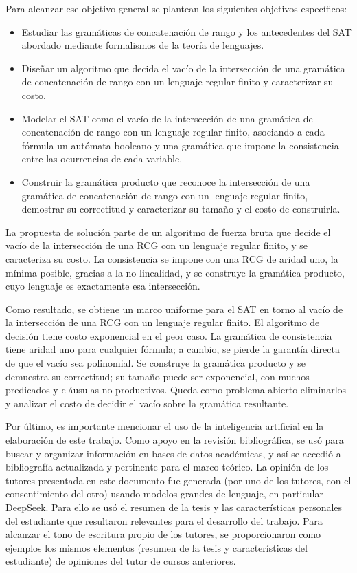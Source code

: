 \documentclass{report}
\begin{document}
Para alcanzar ese objetivo general se plantean los siguientes objetivos
específicos:
\begin{itemize}
  \item Estudiar las gramáticas de concatenación de rango y los
    antecedentes del SAT abordado mediante formalismos de la teoría de
    lenguajes.
  \item Diseñar un algoritmo que decida el vacío de la intersección de una
    gramática de concatenación de rango con un lenguaje regular finito y
    caracterizar su costo.
  \item Modelar el SAT como el vacío de la intersección de una gramática
    de concatenación de rango con un lenguaje regular finito, asociando a
    cada fórmula un autómata booleano y una gramática que impone la
    consistencia entre las ocurrencias de cada variable.
  \item Construir la gramática producto que reconoce la intersección de
    una gramática de concatenación de rango con un lenguaje regular finito,
    demostrar su correctitud y caracterizar su tamaño y el costo de
    construirla.
\end{itemize}

La propuesta de solución parte de un algoritmo de fuerza bruta que decide
el vacío de la intersección de una RCG con un lenguaje regular finito, y
se caracteriza su costo. La consistencia se impone con una RCG de aridad
uno, la mínima posible, gracias a la no linealidad, y se construye la
gramática producto,
cuyo lenguaje es exactamente esa intersección.

Como resultado, se obtiene un marco uniforme para el SAT en torno al
vacío de la intersección de una RCG con un lenguaje regular finito. El
algoritmo de decisión tiene costo exponencial en el peor caso. La
gramática de consistencia tiene aridad uno para cualquier fórmula; a
cambio, se pierde la garantía directa de que el vacío sea polinomial. Se
construye la gramática producto y se demuestra su correctitud; su tamaño
puede ser exponencial, con muchos predicados y cláusulas no productivos.
Queda como problema abierto eliminarlos y analizar el costo de decidir el
vacío sobre la gramática resultante.

Por último, es importante mencionar el uso de la inteligencia
artificial en la elaboración de este trabajo. Como apoyo en la revisión
bibliográfica, se usó para buscar y organizar información en bases de
datos académicas, y así se accedió a bibliografía actualizada y
pertinente para el marco teórico. La opinión de los tutores
presentada en este documento fue generada (por uno de los tutores, con
el consentimiento del otro) usando modelos
grandes de lenguaje, en particular DeepSeek. Para ello se usó el resumen
de la tesis y las características personales del estudiante que resultaron
relevantes para el desarrollo del trabajo. Para alcanzar el tono de
escritura propio de los tutores, se proporcionaron como ejemplos los
mismos elementos (resumen de la tesis y características del estudiante) de
opiniones del tutor de cursos anteriores.
\end{document}
